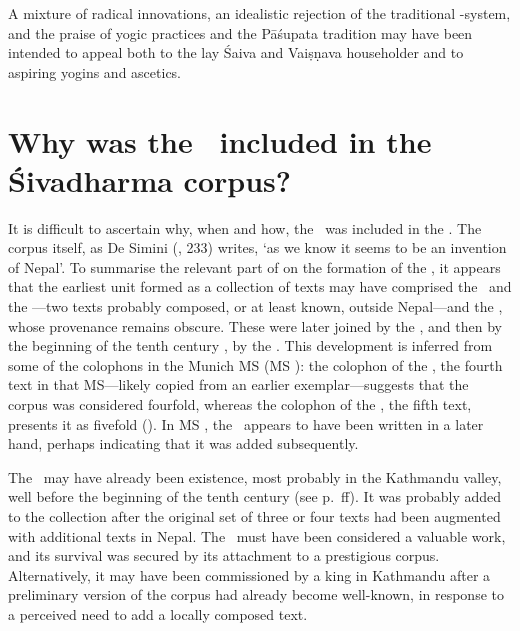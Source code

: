 A mixture of radical innovations, an idealistic rejection of the traditional -system, and the 
praise of yogic practices and the Pāśupata tradition may have been intended to
appeal both to the lay Śaiva and Vaiṣṇava householder and to aspiring yogins and ascetics.

\vfill\pagebreak



\section{Why was the \VSS\ included in the Śivadharma corpus?}

It is difficult to ascertain why, when and how, the \VSS\ was included in the \Sivadharmacorpus.
The corpus itself, as De Simini  (\citeyear{DeSiminiMSSFromNepal2016}, 233) writes,
`as we know it seems to be an invention of Nepal'.
To summarise the relevant part of  on the formation 
of the \Sivadharmacorpus, it appears that the
earliest unit formed as a collection of texts may have comprised the \SDhS\ and
the \SDhU---two texts probably composed, or at least known, outside Nepal---and the
\SDhSangr, whose provenance remains obscure.
These were later joined by the \Ums, and then by the beginning of the tenth century \CE, 
by the \SivaUp.
This development is inferred from some of the colophons in the Munich MS (MS \msM):
the colophon of the \Ums, the fourth text in that MS---likely copied from an earlier exemplar---suggests
that the corpus was considered fourfold, whereas the colophon of the \SivaUp,
the fifth text, presents it as fivefold ().
In MS \msM, the \VSS\ appears to have been written in a later hand, perhaps
indicating that it was added subsequently.


The \VSS\ may have already been existence, most probably in the Kathmandu valley,
well before the beginning of the tenth century (see p.~\pageref{provenance}ff).
It was probably added to the collection after the original set of three or four
texts had been augmented with additional texts in Nepal. The \VSS\ must have been considered
a valuable work, and its survival was secured by its attachment to a 
prestigious corpus. Alternatively, it may have been commissioned by a king in Kathmandu
after a preliminary version of the corpus had already become well-known, 
in response to a perceived need to add a locally composed text.



\vfill\pagebreak

